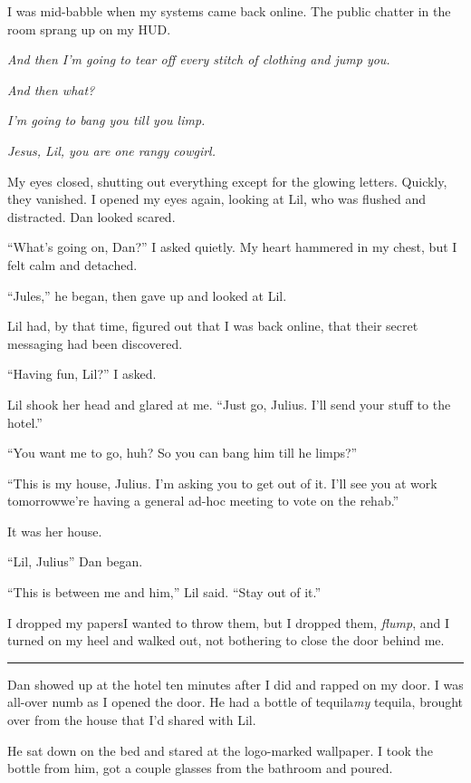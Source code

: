 I was mid-babble when my systems came back online. The public
chatter in the room sprang up on my HUD.

\emph{And then I'm going to tear off every stitch of clothing and jump you.}

\emph{And then what?}

\emph{I'm going to bang you till you limp.}

\emph{Jesus, Lil, you are one rangy cowgirl.}

My eyes closed, shutting out everything except for the glowing
letters. Quickly, they vanished. I opened my eyes again, looking at
Lil, who was flushed and distracted. Dan looked scared.

“What's going on, Dan?” I asked quietly. My heart hammered in my
chest, but I felt calm and detached.

“Jules,” he began, then gave up and looked at Lil.

Lil had, by that time, figured out that I was back online, that
their secret messaging had been discovered.

“Having fun, Lil?” I asked.

Lil shook her head and glared at me. “Just go, Julius. I'll send
your stuff to the hotel.”

“You want me to go, huh? So you can bang him till he limps?”

“This is my house, Julius. I'm asking you to get out of it. I'll
see you at work tomorrow{\dash}we're having a general ad-hoc meeting to
vote on the rehab.”

It was her house.

“Lil, Julius{\dash}” Dan began.

“This is between me and him,” Lil said. “Stay out of it.”

I dropped my papers{\dash}I wanted to throw them, but I drop\-ped them,
\emph{flump}, and I turned on my heel and walked out, not bothering
to close the door behind me.

\begin{center}\rule{1in}{0.4pt}\end{center}

Dan showed up at the hotel ten minutes after I did and rapped on my
door. I was all-over numb as I opened the door. He had a bottle of
tequila{\dash}\emph{my} tequila, brought over from the house that I'd
shared with Lil.

He sat down on the bed and stared at the logo-marked wallpaper. I
took the bottle from him, got a couple glasses from the bathroom
and poured.

